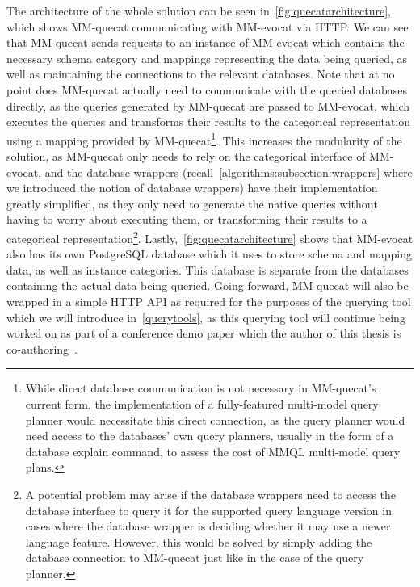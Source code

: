 The architecture of the whole solution can be seen in~\cref{fig:quecatarchitecture}, which shows MM-quecat communicating with MM-evocat via HTTP.
We can see that MM-quecat sends requests to an instance of MM-evocat which contains the necessary schema category and mappings representing the data being queried, as well as maintaining the connections to the relevant databases.
Note that at no point does MM-quecat actually need to communicate with the queried databases directly, as the queries generated by MM-quecat are passed to MM-evocat, which executes the queries and transforms their results to the categorical representation using a mapping provided by MM-quecat\footnote{While direct database communication is not necessary in MM-quecat's current form, the implementation of a fully-featured multi-model query planner would necessitate this direct connection, as the query planner would need access to the databases' own query planners, usually in the form of a database explain command, to assess the cost of MMQL multi-model query plans.}.
This increases the modularity of the solution, as MM-quecat only needs to rely on the categorical interface of MM-evocat, and the database wrappers (recall~\cref{algorithms:subsection:wrappers} where we introduced the notion of database wrappers) have their implementation greatly simplified, as they only need to generate the native queries without having to worry about executing them, or transforming their results to a categorical representation\footnote{A potential problem may arise if the database wrappers need to access the database interface to query it for the supported query language version in cases where the database wrapper is deciding whether it may use a newer language feature. However, this would be solved by simply adding the database connection to MM-quecat just like in the case of the query planner.}.
Lastly,~\cref{fig:quecatarchitecture} shows that MM-evocat also has its own PostgreSQL database which it uses to store schema and mapping data, as well as instance categories.
This database is separate from the databases containing the actual data being queried.
Going forward, MM-quecat will also be wrapped in a simple HTTP API as required for the purposes of the querying tool which we will introduce in~\cref{querytools}, as this querying tool will continue being worked on as part of a conference demo paper which the author of this thesis is co-authoring~\cite{mm_quecat}.

